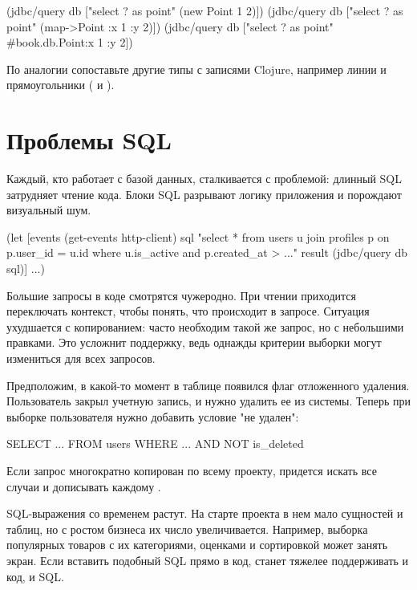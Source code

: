 \begin{english}
  \begin{clojure}
(jdbc/query db ["select ? as point" (new Point 1 2)])
(jdbc/query db ["select ? as point" (map->Point {:x 1 :y 2})])
(jdbc/query db ["select ? as point" #book.db.Point{:x 1 :y 2}])
  \end{clojure}
\end{english}

По аналогии сопоставьте другие типы с записями Clojure, например линии и прямоугольники ( и ).

\section{Проблемы SQL}

Каждый, кто работает с базой данных, сталкивается с проблемой: длинный SQL затрудняет чтение кода. Блоки SQL разрывают логику приложения и порождают визуальный шум.

\begin{english}
  \begin{clojure}
(let [events (get-events http-client)
      sql "select * from users u
join profiles p on p.user_id = u.id
where u.is_active
and p.created_at > ..."
      result (jdbc/query db sql)]
  ...)
  \end{clojure}
\end{english}

Большие запросы в коде смотрятся чужеродно. При чтении приходится переключать контекст, чтобы понять, что происходит в запросе. Ситуация ухудшается с копированием: часто необходим такой же запрос, но с небольшими правками. Это усложнит поддержку, ведь однажды критерии выборки могут измениться для всех запросов.

Предположим, в какой-то момент в таблице появился флаг отложенного удаления. Пользователь закрыл учетную запись, и нужно удалить ее из системы. Теперь при выборке пользователя нужно добавить условие "не удален":

\begin{english}
  \begin{clojure}
SELECT ... FROM users WHERE ... AND NOT is_deleted
  \end{clojure}
\end{english}

Если запрос многократно копирован по всему проекту, придется искать все случаи и дописывать каждому .

SQL-выражения со временем растут. На старте проекта в нем мало сущностей и таблиц, но с ростом бизнеса их число увеличивается. Например, выборка популярных товаров с их категориями, оценками и сортировкой может занять экран. Если вставить подобный SQL прямо в код, станет тяжелее поддерживать и код, и SQL.

